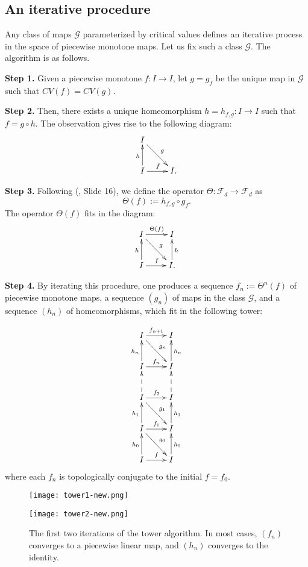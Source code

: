 \documentclass[11pt]{amsart}
\begin{document}
\subsection{An iterative procedure}

Any class of maps $\mathcal{G}$ parameterized by critical values defines an iterative  process in the space of piecewise monotone maps.
Let us fix such a class $\mathcal{G}$. The algorithm is as follows. 

\smallskip
\textbf{Step 1.} Given a piecewise monotone $f : I \to I$, let $g = g_f$ be the unique map in $\mathcal{G}$ such that 
$CV(f) = CV(g)$.

\smallskip
\textbf{Step 2.} Then, there exists a unique
homeomorphism $h = h_{f, g} : I \to I$ such that $f = g \circ h$.
The observation gives rise to the following diagram:
$$\xymatrix{
I \ar[dr]^g  \\
I \ar[r]^{f} \ar[u]^h & I  .
}$$

\smallskip
\textbf{Step 3.} Following (\cite{Mil-slides}, Slide 16), we define the operator $\Theta : \mathcal{F}_d \to \mathcal{F}_d$ as 
$$\Theta(f) := h_{f, g} \circ g_f.$$
The operator $\Theta(f)$ fits in the diagram:
$$\xymatrix{
I \ar[r]^{\Theta(f)} \ar[dr]^g & I \\
I \ar[r]^{f} \ar[u]^h & I \ar[u]_h .
}$$

\smallskip \textbf{Step 4.} By iterating this procedure, one produces a sequence $f_n := \Theta^n(f)$ of piecewise monotone maps, 
a sequence $(g_n)$ of maps in the class $\mathcal{G}$, and a sequence $(h_n)$ of homeomorphisms, 
which fit in the following tower:

$$\xymatrix{
I \ar[r]^{f_{n+1}} \ar[dr]^{g_n} & I  \\
I \ar[r]^{f_n} \ar[u]^{h_n} & I  \ar[u]_{h_n} \\
I \ar[r]^{f_2} \ar[dr]^{g_1} \ar@{-->}[u]  & I  \ar@{-->}[u] \\
I \ar[r]^{f_1} \ar[dr]^{g_0} \ar[u]^{h_1} & I \ar[u]_{h_1} \\
I \ar[r]^{f} \ar[u]^{h_0} & I \ar[u]_{h_0} 
}$$
where each $f_n$ is topologically conjugate to the initial $f = f_0$.

\begin{figure}
\begin{center}
\begin{minipage}{0.49 \textwidth} 
\texttt{[image: tower1-new.png]}
\end{minipage}
\begin{minipage}{0.49 \textwidth}
\texttt{[image: tower2-new.png]}
\end{minipage}
\end{center}
\caption{The first two iterations of the tower algorithm. In most cases, $(f_n)$ converges 
to a piecewise linear map, and $(h_n)$ converges to the identity.}
\end{figure}
\end{document}
